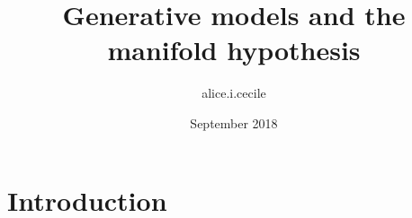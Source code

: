 \documentclass{article}
\title{Generative models and the manifold hypothesis}
\author{alice.i.cecile }
\date{September 2018}
\begin{document}
\maketitle

\section{Introduction}
\end{document}
